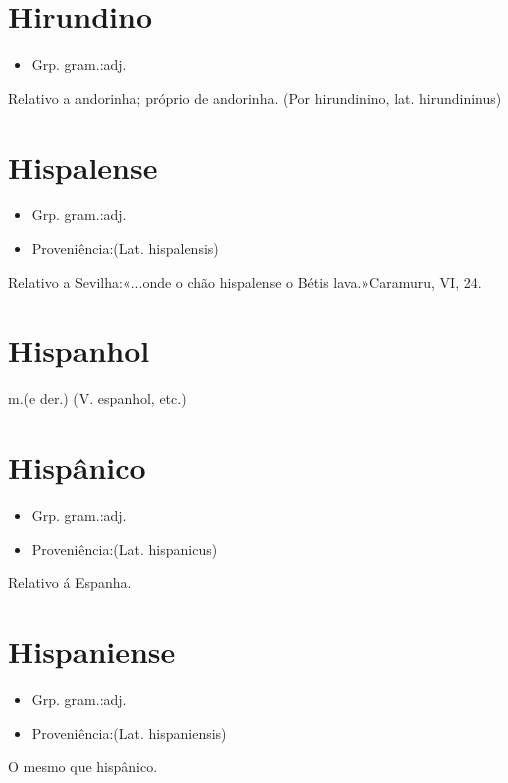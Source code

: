 \documentclass{article}
\begin{document}
\section{Hirundino}
\begin{itemize}
\item {Grp. gram.:adj.}
\end{itemize}
Relativo a andorinha; próprio de andorinha.
(Por \textunderscore hirundinino\textunderscore , lat. \textunderscore hirundininus\textunderscore )
\section{Hispalense}
\begin{itemize}
\item {Grp. gram.:adj.}
\end{itemize}
\begin{itemize}
\item {Proveniência:(Lat. \textunderscore hispalensis\textunderscore )}
\end{itemize}
Relativo a Sevilha:«\textunderscore ...onde o chão hispalense o Bétis lava.\textunderscore »\textunderscore Caramuru\textunderscore , VI, 24.
\section{Hispanhol}
\textunderscore m.\textunderscore  (e der.)
(V. \textunderscore espanhol\textunderscore , etc.)
\section{Hispânico}
\begin{itemize}
\item {Grp. gram.:adj.}
\end{itemize}
\begin{itemize}
\item {Proveniência:(Lat. \textunderscore hispanicus\textunderscore )}
\end{itemize}
Relativo á Espanha.
\section{Hispaniense}
\begin{itemize}
\item {Grp. gram.:adj.}
\end{itemize}
\begin{itemize}
\item {Proveniência:(Lat. \textunderscore hispaniensis\textunderscore )}
\end{itemize}
O mesmo que \textunderscore hispânico\textunderscore .
\end{document}
